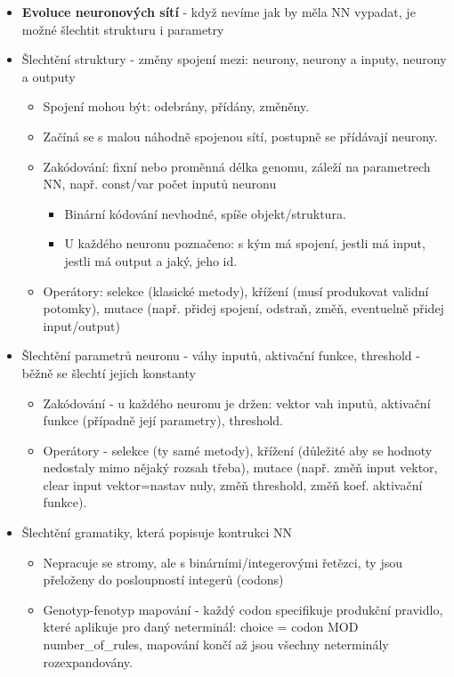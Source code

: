 \documentclass[a4paper,hidelinks]{article}
\begin{document}
\begin{itemize}
    \item \textbf{Evoluce neuronových sítí} - když nevíme jak by měla NN vypadat, je možné šlechtit strukturu i parametry
    \item Šlechtění struktury - změny spojení mezi: neurony, neurony a inputy, neurony a outputy
        \begin{itemize}
            \item Spojení mohou být: odebrány, přídány, změněny.
            \item Začíná se s malou náhodně spojenou sítí, postupně se přídávají neurony.
            \item Zakódování: fixní nebo proměnná délka genomu, záleží na parametrech NN, např. const/var počet inputů neuronu
                \begin{itemize}
                    \item Binární kódování nevhodné, spíše objekt/struktura.
                    \item U každého neuronu poznačeno: s kým má spojení, jestli má input, jestli má output a jaký, jeho id.
                \end{itemize}
            \item Operátory: selekce (klasické metody), křížení (musí produkovat validní potomky), mutace (např. přidej spojení, odstraň, změň, eventuelně přidej input/output)
        \end{itemize}
    \item Šlechtění parametrů neuronu - váhy inputů, aktivační funkce, threshold - běžně se šlechtí jejich konstanty 
        \begin{itemize}
            \item Zakódování - u každého neuronu je držen: vektor vah inputů, aktivační funkce (případně její parametry), threshold.
            \item Operátory - selekce (ty samé metody), křížení (důležité aby se hodnoty nedostaly mimo nějaký rozsah třeba), mutace (např. změň input vektor, clear input vektor=nastav nuly, změň threshold, změň koef. aktivační funkce).
        \end{itemize}
    \item Šlechtění gramatiky, která popisuje kontrukci NN
        \begin{itemize}
            \item Nepracuje se stromy, ale s binárními/integerovými řetězci, ty jsou přeloženy do posloupností integerů (codons)
            \item Genotyp-fenotyp mapování - každý codon specifikuje produkční pravidlo, které aplikuje pro daný neterminál: choice = codon MOD number\_of\_rules, mapování končí až jsou všechny neterminály rozexpandovány.

\end{itemize}
\end{itemize}
\end{document}
